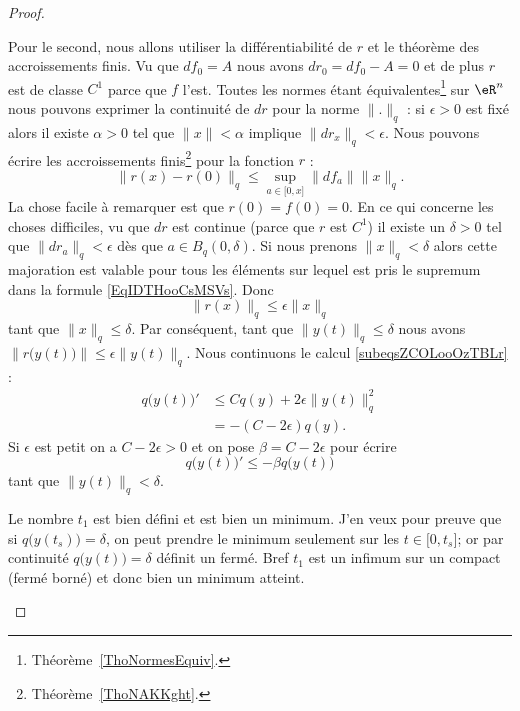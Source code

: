 \begin{proof}
\begin{subproof}
		Pour le second, nous allons utiliser la différentiabilité de \( r\) et le théorème des accroissements finis. Vu que \( df_0=A\) nous avons \( dr_0=df_0-A=0\) et de plus \( r\) est de classe \( C^1\) parce que \( f\) l'est. Toutes les normes étant équivalentes\footnote{Théorème~\ref{ThoNormesEquiv}.} sur \( \eR^n\) nous pouvons exprimer la continuité de \( dr\) pour la norme \( \| . \|_q\) : si \( \epsilon>0\) est fixé alors il existe \( \alpha>0\) tel que \( \| x \|<\alpha\) implique \( \| dr_x \|_q<\epsilon\). Nous pouvons écrire les accroissements finis\footnote{Théorème~\ref{ThoNAKKght}.} pour la fonction \( r\) :
		\begin{equation}    \label{EqIDTHooCsMSVs}
			\| r(x)-r(0) \|_q\leq \sup_{a\in\mathopen[ 0 , x \mathclose]}\| df_a \|\| x \|_q.
		\end{equation}
		La chose facile à remarquer est que \( r(0)=f(0)=0\). En ce qui concerne les choses difficiles, vu que \( dr\) est continue (parce que \( r\) est \( C^1\)) il existe un \( \delta>0\) tel que \( \| dr_a \|_q<\epsilon\) dès que \( a\in B_q(0,\delta)\). Si nous prenons \( \| x \|_q<\delta\) alors cette majoration est valable pour tous les éléments sur lequel est pris le supremum dans la formule \eqref{EqIDTHooCsMSVs}. Donc
		\begin{equation}
			\| r(x) \|_q\leq \epsilon\| x \|_q
		\end{equation}
		tant que \( \| x \|_q\leq \delta\). Par conséquent, tant que \(  \| y(t) \|_q\leq \delta\) nous avons \( \| r\big( y(t) \big) \|\leq \epsilon\| y(t) \|_q\). Nous continuons le calcul \eqref{subeqsZCOLooOzTBLr} :
		\begin{subequations}
			\begin{align}
				q\big( y(t) \big)' & \leq Cq(y)+2\epsilon\| y(t) \|_q^2 \\
				                   & =-(C-2\epsilon)q(y).
			\end{align}
		\end{subequations}
		Si \( \epsilon\) est petit on a \( C-2\epsilon >0 \) et on pose \( \beta=C-2\epsilon\) pour écrire
		\begin{equation}    \label{EqEYJIooHvSBic}
			q\big( y(t) \big)'\leq -\beta q\big( y(t) \big)
		\end{equation}
		tant que \( \| y(t) \|_q<\delta\).

		Le nombre \( t_1\) est bien défini et est bien un minimum. J'en veux pour preuve que si \( q\big( y(t_s) \big)=\delta\), on peut prendre le minimum seulement sur les \( t\in\mathopen[ 0 , t_s \mathclose]\); or par continuité \( q\big( y(t) \big)=\delta\) définit un fermé. Bref \( t_1\) est un infimum sur un compact (fermé borné) et donc bien un minimum atteint.


\end{subproof}
\end{proof}

